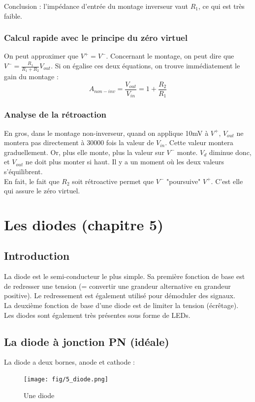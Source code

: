 \documentclass[a4paper]{article}
\begin{document}
    Conclusion : l'impédance d'entrée du montage inverseur vaut $R_1$, ce qui est
    très faible.

    \subsubsection{Calcul rapide avec le principe du zéro virtuel}
    On peut approximer que $V^+ = V^-$. Concernant le montage, on peut dire que
    $V^- = \frac{R_1}{R_1+R_2}V_{out}$. Si on égalise ces deux équations, on trouve
    immédiatement le gain du montage : 
    $$ A_{non-inv} = \frac{V_{out}}{V_{in}} = 1 + \frac{R_2}{R_1} $$

    \subsubsection{Analyse de la rétroaction}
    En gros, dans le montage non-inverseur, quand on applique 10mV à $V^+$, 
    $V_{out}$ ne montera pas directement à 30000 fois la valeur de $V_{in}$.
    Cette valeur montera graduellement. Or, plus elle monte, plus la valeur 
    sur $V^-$ monte. $V_d$ diminue donc, et $V_{out}$ ne doit plus monter
    si haut. Il y a un moment où les deux valeurs s'équilibrent.\\

    En fait, le fait que $R_2$ soit rétroactive permet que $V^-$ "poursuive" $V^+$.
    C'est elle qui assure le zéro virtuel.

\section{Les diodes (chapitre 5)}
    
    \subsection{Introduction}
    La diode est le semi-conducteur le plus simple. Sa première fonction de base est de 
    redresser une tension (= convertir une grandeur alternative en grandeur positive).
    Le redressement est également utilisé pour démoduler des signaux.\\

    La deuxième fonction de base d'une diode est de limiter la tension (écrêtage).\\

    Les diodes sont également très présentes sous forme de LEDs.

    \subsection{La diode à jonction PN (idéale)}
    La diode a deux bornes, anode et cathode :
    \begin{figure}[H]
        \begin{center}
            \texttt{[image: fig/5\_diode.png]}
            \caption{Une diode}
            \label{fig:5_diode}
        \end{center}
    \end{figure}
\end{document}
